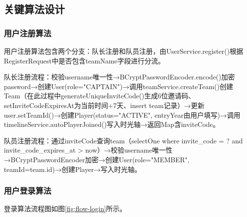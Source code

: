 \documentclass[12pt,a4paper]{ctexart}
\begin{document}
\subsection{关键算法设计}

\subsubsection{用户注册算法}

用户注册算法包含两个分支：队长注册和队员注册，由UserService.register()根据RegisterRequest中是否包含teamName字段进行分流。

队长注册流程：校验username唯一性→BCryptPasswordEncoder.encode()加密password→创建User(role="CAPTAIN")→调用teamService.createTeam()创建Team（在此过程中generateUniqueInviteCode()生成6位邀请码、setInviteCodeExpiresAt为当前时间+7天、insert team记录）→更新user.setTeamId()→创建Player(status="ACTIVE", entryYear由用户填写)→调用timelineService.autoPlayerJoined()写入时光轴→返回Map含inviteCode。

队员注册流程：通过inviteCode查询team（selectOne where invite\_code = ? and invite\_code\_expires\_at > now）→校验username唯一性→BCryptPasswordEncoder加密→创建User(role="MEMBER", teamId=team.id)→创建Player→写入时光轴。

\subsubsection{用户登录算法}

登录算法流程图如图\ref{fig:flow-login}所示。
\end{document}
